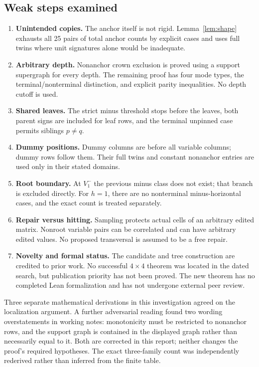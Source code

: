 \documentclass[11pt,a4paper]{article}
\theoremstyle{remark}
\begin{document}
\subsection{Weak steps examined}
\begin{enumerate}
\item \textbf{Unintended copies.} The anchor itself is not rigid.
Lemma~\ref{lem:shape} exhausts all 25 pairs of total anchor counts
by explicit cases and uses full twins where unit signatures alone
would be inadequate.
\item \textbf{Arbitrary depth.} Nonanchor crown exclusion is proved
using a support supergraph for every depth. The remaining proof
has four mode types, the terminal/nonterminal distinction, and
explicit parity inequalities. No depth cutoff is used.
\item \textbf{Shared leaves.} The strict minus threshold stops before
the leaves, both parent signs are included for leaf rows, and
the terminal unpinned case permits siblings \(p\ne q\).
\item \textbf{Dummy positions.} Dummy columns are before all variable
columns; dummy rows follow them. Their full twins and constant
nonanchor entries are used only in their stated domains.
\item \textbf{Root boundary.} At \(V_1^-\) the previous minus class
does not exist; that branch is excluded directly. For \(h=1\),
there are no nonterminal minus-horizontal cases, and the exact
count is treated separately.
\item \textbf{Repair versus hitting.} Sampling protects actual cells
of an arbitrary edited matrix. Nonroot variable pairs can be
correlated and can have arbitrary edited values. No proposed
transversal is assumed to be a free repair.
\item \textbf{Novelty and formal status.} The candidate and tree
construction are credited to prior work. No successful \(4\times4\)
theorem was located in the dated search, but publication priority
has not been proved. The new theorem has no completed Lean
formalization and has not undergone external peer review.
\end{enumerate}

Three separate mathematical derivations in this investigation agreed
on the localization argument. A further adversarial reading found two
wording overstatements in working notes: monotonicity must be restricted
to nonanchor rows, and the support graph is contained in the displayed
graph rather than necessarily equal to it. Both are corrected in this
report; neither changes the proof's required hypotheses. The exact
three-family count was independently rederived rather than inferred
from the finite table.
\end{document}
